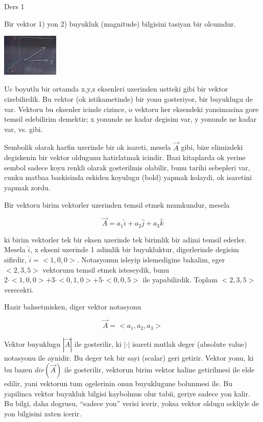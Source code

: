 \documentclass[12pt,fleqn]{article}\usepackage{../common}
\begin{document}
Ders 1

Bir vektor 1) yon 2) buyukluk (magnitude) bilgisini tasiyan bir olcumdur. 

\includegraphics[height=2cm]{1_1.png}

Uc boyutlu bir ortamda x,y,z eksenleri uzerinden ustteki gibi bir vektor
cizebilirdik. Bu vektor (ok istikametinde) bir yonu gosteriyor, bir
buyuklugu de var. Vektoru bu eksenler icinde cizince, o vektoru her
eksendeki yansimasina gore temsil edebilirim demektir; x yonunde ne kadar
degisim var, y yonunde ne kadar var, vs. gibi.

Sembolik olarak harfin uzerinde bir ok isareti, mesela $\vec{A}$ gibi, bize
elimizdeki degiskenin bir vektor oldugunu hatirlatmak icindir. Bazi
kitaplarda ok yerine sembol sadece koyu renkli olarak gosterilmis olabilir,
bunu tarihi sebepleri var, cunku matbaa baskisinda eskiden koyulugu (bold)
yapmak kolaydi, ok isaretini yapmak zordu. 

Bir vektoru birim vektorler uzerinden temsil etmek mumkundur, mesela 

\[ \vec{A} = a_1 \hat{i} + a_2 \hat{j} + a_3 \hat{k} \]

ki birim vektorler tek bir eksen uzerinde tek birimlik bir adimi temsil
ederler. Mesela $\hat{i}$, x ekseni uzerinde 1 adimlik bir buyukluktur,
digerlerinde degisim sifirdir, $\hat{i} = <1,0,0>$. Notasyonun isleyip
islemedigine bakalim, eger $<2,3,5>$ vektorunu temsil etmek isteseydik,
bunu $2\cdot<1,0,0> + 3\cdot<0,1,0> + 5\cdot<0,0,5>$ ile
yapabilirdik. Toplam $<2,3,5>$ verecekti. 

Hazir bahsetmisken, diger vektor notasyonu

\[ \vec{A} = <a_1, a_2, a_3> \]

Vektor buyuklugu $|\vec{A}|$ ile gosterilir, ki $|\cdot|$ isareti mutlak
deger (absolute value) notasyonu ile aynidir. Bu deger tek bir sayi
(scalar) geri getirir. Vektor yonu, ki bu bazen $dir(\vec{A})$ ile
gosterilir, vektorun birim vektor haline getirilmesi ile elde edilir, yani
vektorun tum ogelerinin onun buyuklugune bolunmesi ile. Bu yapilinca vektor
buyukluk bilgisi kaybolmus olur tabii, geriye sadece yon kalir. Bu bilgi,
daha dogrusu, ``sadece yon'' verisi icerir, yoksa vektor oldugu sekliyle de
yon bilgisini zaten icerir.
\end{document}
